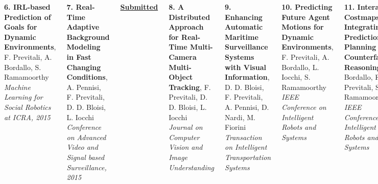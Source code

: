 \begin{frame}
\begin{columns}[t]
		\vspace{0.15cm}
		
		\textbf{6. IRL-based Prediction of Goals for Dynamic Environments}, F. Previtali, A. Bordallo,
		S. Ramamoorthy \\
		\emph{Machine Learning for Social Robotics at ICRA, 2015}
		
		
		\vspace{0.34cm}
		
		\tiny
		
		\textbf{7. Real-Time Adaptive Background Modeling in Fast Changing Conditions}, A. Pennisi, F.
		Previtali, D. D. Bloisi, L. Iocchi \\
		\emph{Conference on Advanced Video and Signal based Surveillance, 2015}
		
		\vspace{0.2cm}
		
		\textbf{\underline{Submitted}}
		
		\vspace{0.1cm}
		
		\textbf{8. A Distributed Approach for Real-Time Multi-Camera Multi-Object Tracking}, F.
		Previtali, D. D. Bloisi, L. Iocchi \\
		\emph{Journal on Computer Vision and Image Understanding}
		
		\vspace{0.15cm}
		
		\textbf{9. Enhancing Automatic Maritime Surveillance Systems with Visual Information}, D. D.
		Bloisi, F. Previtali, A. Pennisi, D. Nardi, M. Fiorini \\
		\emph{Transaction on Intelligent Transportation Systems}
		
		\vspace{0.15cm}
		
		\textbf{10. Predicting Future Agent Motions for Dynamic Environments}, F. Previtali, A.
		Bordallo, L. Iocchi, S. Ramamoorthy \\
		\emph{IEEE Conference on Intelligent Robots and Systems}
		
		\vspace{0.15cm}
		
		\textbf{11. Interactive Costmaps: Integrating Prediction and Planning with Counterfactual
		Reasoning}, A. Bordallo, F. Previtali, S. Ramamoorthy \\
		\emph{IEEE Conference on Intelligent Robots and Systems}
	\end{columns}
	
	
\end{frame}
